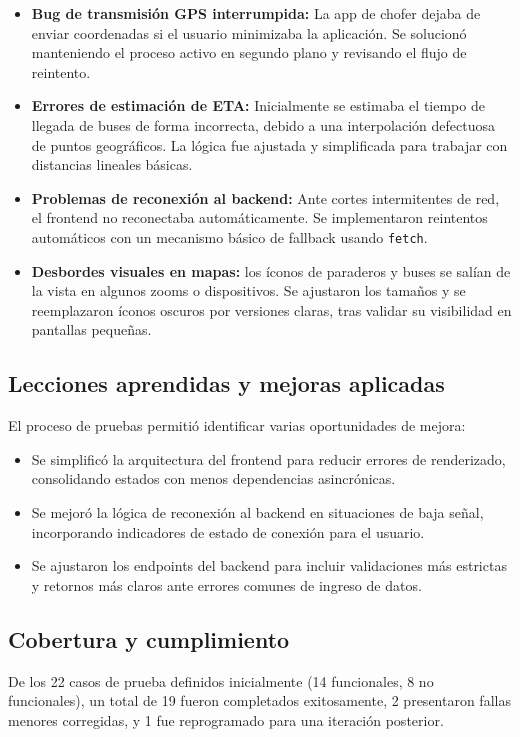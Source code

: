 \documentclass[12pt]{article}
\begin{document}
\begin{itemize}
    \item \textbf{Bug de transmisión GPS interrumpida:} La app de chofer dejaba de enviar coordenadas si el usuario minimizaba la aplicación. Se solucionó manteniendo el proceso activo en segundo plano y revisando el flujo de reintento.
    
    \item \textbf{Errores de estimación de ETA:} Inicialmente se estimaba el tiempo de llegada de buses de forma incorrecta, debido a una interpolación defectuosa de puntos geográficos. La lógica fue ajustada y simplificada para trabajar con distancias lineales básicas.
    
    \item \textbf{Problemas de reconexión al backend:} Ante cortes intermitentes de red, el frontend no reconectaba automáticamente. Se implementaron reintentos automáticos con un mecanismo básico de fallback usando \texttt{fetch}.
    
    \item \textbf{Desbordes visuales en mapas:} los íconos de paraderos y buses se salían de la vista en algunos zooms o dispositivos. Se ajustaron los tamaños y se reemplazaron íconos oscuros por versiones claras, tras validar su visibilidad en pantallas pequeñas.
\end{itemize}

\subsection{Lecciones aprendidas y mejoras aplicadas}
El proceso de pruebas permitió identificar varias oportunidades de mejora:

\begin{itemize}
    \item Se simplificó la arquitectura del frontend para reducir errores de renderizado, consolidando estados con menos dependencias asincrónicas.
    \item Se mejoró la lógica de reconexión al backend en situaciones de baja señal, incorporando indicadores de estado de conexión para el usuario.
    \item Se ajustaron los endpoints del backend para incluir validaciones más estrictas y retornos más claros ante errores comunes de ingreso de datos.
\end{itemize}

\clearpage
\subsection{Cobertura y cumplimiento}
De los 22 casos de prueba definidos inicialmente (14 funcionales, 8 no funcionales), un total de 19 fueron completados exitosamente, 2 presentaron fallas menores corregidas, y 1 fue reprogramado para una iteración posterior.
\end{document}
